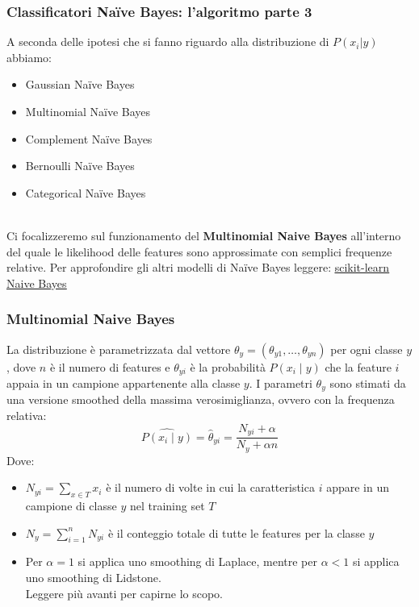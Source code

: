 \begin{frame}
	
	\frametitle{Classificatori Naïve Bayes: l'algoritmo parte 3}
	
	A seconda delle ipotesi che si fanno riguardo alla distribuzione di $P(x_i \vert y)$ abbiamo:
	\begin{itemize}
		\item Gaussian Naïve Bayes%
		\item Multinomial Naïve Bayes%
		\item Complement Naïve Bayes
		\item Bernoulli Naïve Bayes
		\item Categorical Naïve Bayes
	\end{itemize}
	\ \\
	Ci focalizzeremo sul funzionamento del \textbf{Multinomial Naive Bayes} all'interno del quale le likelihood delle features sono approssimate con semplici frequenze relative.
	\newlinedouble
	Per approfondire gli altri modelli di Naïve Bayes leggere: \underline{\href{https://scikit-learn.org/stable/modules/naive_bayes.html}{scikit-learn Naive Bayes}}
\end{frame}



\begin{frame}
	
	\frametitle{Multinomial Naive Bayes}
	
	La distribuzione è parametrizzata dal vettore $\theta_y = (\theta_{y1},\ldots,\theta_{yn})$ per ogni classe $y$, dove $n$ è il numero di features e $\theta_{yi}$ è la probabilità $P(x_i \mid y)$ che la feature $i$ appaia in un campione appartenente alla classe $y$.
	\newlinedouble
	I parametri $\theta_y$ sono stimati da una versione smoothed della massima verosimiglianza, ovvero con la frequenza relativa:
	$$\hat{P(x_i \mid y)} = \hat{\theta}_{yi} = \frac{ N_{yi} + \alpha}{N_y + \alpha n}$$
	Dove:
	\begin{itemize}
		\item $N_{yi} = \sum_{x \in T} x_i$ è il numero di volte in cui la caratteristica $i$ appare in un campione di classe $y$ nel training set $T$
		\item $N_{y} = \sum_{i=1}^{n} N_{yi}$ è il conteggio totale di tutte le features per la classe $y$
		\item Per $\alpha = 1$ si applica uno smoothing di Laplace, mentre per $\alpha < 1$ si applica uno smoothing di Lidstone.\\
			Leggere più avanti per capirne lo scopo.
	\end{itemize}

\end{frame}


